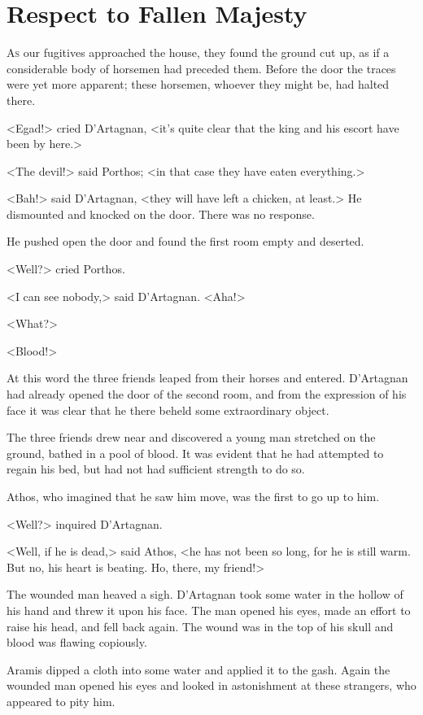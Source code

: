 \chapter{Respect to Fallen Majesty}

 \lettrine{A}{s} our fugitives approached the house, they found the ground cut up, as if a considerable body of horsemen had preceded them. Before the door the traces were yet more apparent; these horsemen, whoever they might be, had halted there.

\zz
<Egad!> cried D'Artagnan, <it's quite clear that the king and his escort have been by here.>

<The devil!> said Porthos; <in that case they have eaten everything.>

<Bah!> said D'Artagnan, <they will have left a chicken, at least.> He dismounted and knocked on the door. There was no response.

He pushed open the door and found the first room empty and deserted.

<Well?> cried Porthos.

<I can see nobody,> said D'Artagnan. <Aha!>

<What?>

<Blood!>

At this word the three friends leaped from their horses and entered. D'Artagnan had already opened the door of the second room, and from the expression of his face it was clear that he there beheld some extraordinary object.

The three friends drew near and discovered a young man stretched on the ground, bathed in a pool of blood. It was evident that he had attempted to regain his bed, but had not had sufficient strength to do so.

Athos, who imagined that he saw him move, was the first to go up to him.

<Well?> inquired D'Artagnan.

<Well, if he is dead,> said Athos, <he has not been so long, for he is still warm. But no, his heart is beating. Ho, there, my friend!>

The wounded man heaved a sigh. D'Artagnan took some water in the hollow of his hand and threw it upon his face. The man opened his eyes, made an effort to raise his head, and fell back again. The wound was in the top of his skull and blood was flawing copiously.

Aramis dipped a cloth into some water and applied it to the gash. Again the wounded man opened his eyes and looked in astonishment at these strangers, who appeared to pity him.

